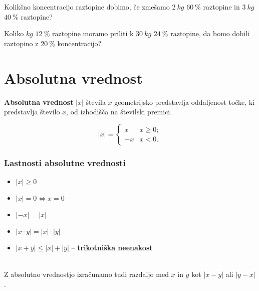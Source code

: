                 \begin{naloga}
                    Kolikšno koncentracijo raztopine dobimo, če zmešamo $2~kg$ $60~\%$ raztopine in $3~kg$ $40~\%$ raztopine? 
                \end{naloga}
    
                \begin{naloga}
                    Koliko $kg$ $12~\%$ raztopine moramo priliti k $30~kg$ $24~\%$ raztopine, da bomo dobili raztopino z $20~\%$ koncentracijo? 
                \end{naloga}
            



\newpage

\section{Absolutna vrednost}

        
            \textbf{Absolutna vrednost} $|x|$ števila $x$ geometrijsko predstavlja oddaljenost točke, 
            ki predstavlja število $x$, od izhodišča na številski premici.
        

       
            $$|x|=\begin{cases} x &x\geq 0; \\ -x & x<0. \end{cases}$$
        



        \subsubsection*{Lastnosti absolutne vrednosti}
                    \begin{itemize}
                        \item $|x|\geq 0$
                        \item $|x|=0 \Leftrightarrow x=0$
                        \item $|-x|=|x|$
                        \item $|x\cdot y|=|x|\cdot|y|$
                        \item $|x+y|\leq |x|+|y|$ -- \textbf{trikotniška neenakost}
                    \end{itemize}

        ~\\

        
            Z absolutno vrednostjo izračunamo tudi razdaljo med $x$ in $y$ kot $|x-y|$ ali $|y-x|$.
        
